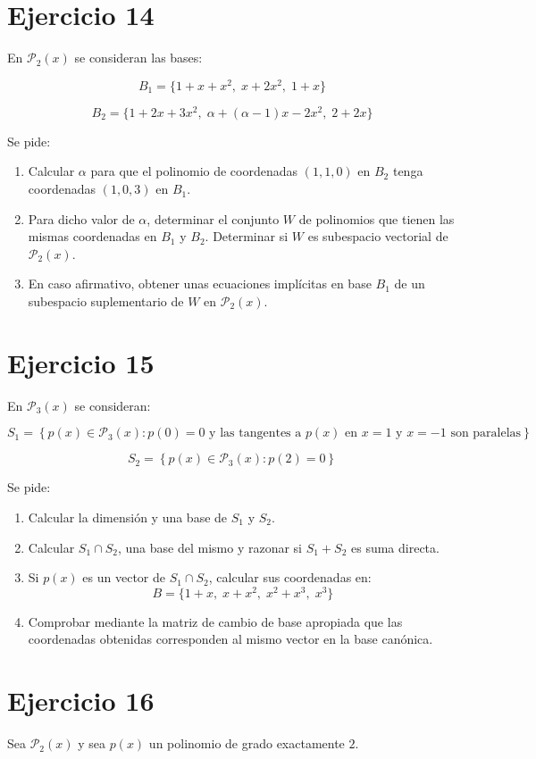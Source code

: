 \documentclass[11pt,a4paper]{article}
\newcommand{\Pn}{\mathcal{P}}
\begin{document}
\section{Ejercicio 14}
En $\Pn_2(x)$ se consideran las bases:

\[
B_1=
\{1+x+x^2,\;x+2x^2,\;1+x\}
\]

\[
B_2=
\{1+2x+3x^2,\;
\alpha+(\alpha-1)x-2x^2,\;
2+2x\}
\]

Se pide:

\begin{enumerate}[label=\alph*)]
	\item Calcular $\alpha$ para que el polinomio de coordenadas $(1,1,0)$ en $B_2$ tenga coordenadas $(1,0,3)$ en $B_1$.
	\item Para dicho valor de $\alpha$, determinar el conjunto $W$ de polinomios que tienen las mismas coordenadas en $B_1$ y $B_2$. Determinar si $W$ es subespacio vectorial de $\Pn_2(x)$.
	\item En caso afirmativo, obtener unas ecuaciones implícitas en base $B_1$ de un subespacio suplementario de $W$ en $\Pn_2(x)$.
\end{enumerate}

\section{Ejercicio 15}
En $\Pn_3(x)$ se consideran:

\[
S_1=
\left\{
p(x)\in\Pn_3(x):
p(0)=0
\text{ y las tangentes a }p(x)
\text{ en }x=1\text{ y }x=-1
\text{ son paralelas}
\right\}
\]

\[
S_2=
\left\{
p(x)\in\Pn_3(x):
p(2)=0
\right\}
\]

Se pide:

\begin{enumerate}[label=\alph*)]
	\item Calcular la dimensión y una base de $S_1$ y $S_2$.
	\item Calcular $S_1\cap S_2$, una base del mismo y razonar si $S_1+S_2$ es suma directa.
	\item Si $p(x)$ es un vector de $S_1\cap S_2$, calcular sus coordenadas en:
	\[
	B=
	\{1+x,\;x+x^2,\;x^2+x^3,\;x^3\}
	\]
	\item Comprobar mediante la matriz de cambio de base apropiada que las coordenadas obtenidas corresponden al mismo vector en la base canónica.
\end{enumerate}

\section{Ejercicio 16}
Sea $\Pn_2(x)$ y sea $p(x)$ un polinomio de grado exactamente $2$.
\end{document}
